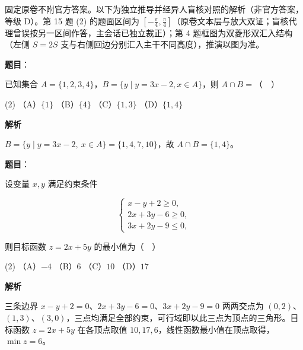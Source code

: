 

\begin{gktip}
固定原卷不附官方答案。以下为独立推导并经异人盲核对照的解析（非官方答案，等级 D）。第 15 题 (2) 的题面区间为 \(\left[-\frac{\pi}{4},\frac{\pi}{4}\right]\)（原卷文本层与放大双证；盲核代理曾误按另一区间作答，主会话已独立裁正）；第 4 题框图为双菱形双汇入结构（左侧 \(S=2S\) 支与右侧回边分别汇入主干不同高度），推演以图为准。
\end{gktip}

\begin{answer}

\textbf{题目}：

已知集合 \(A=\{1,2,3,4\}\)，\(B=\{y\mid y=3x-2,x\in A\}\)，则 \(A\cap B=\)（　）

\begin{gkopts}(2)
\task （A）\(\{1\}\)
\task （B）\(\{4\}\)
\task （C）\(\{1,3\}\)
\task （D）\(\{1,4\}\)
\end{gkopts}

\textbf{解析}

\(B=\{y\mid y=3x-2,\ x\in A\}=\{1,4,7,10\}\)，故 \(A\cap B=\{1,4\}\)。


\end{answer}
\begin{answer}

\textbf{题目}：

设变量 \(x,y\) 满足约束条件

\nopagebreak[4]
\[
\begin{cases}
x-y+2\geqslant 0,\\
2x+3y-6\geqslant 0,\\
3x+2y-9\leqslant 0,
\end{cases}
\]

则目标函数 \(z=2x+5y\) 的最小值为（　）

\begin{gkopts}(2)
\task （A）\(-4\)
\task （B）\(6\)
\task （C）\(10\)
\task （D）\(17\)
\end{gkopts}

\textbf{解析}

三条边界 \(x-y+2=0\)、\(2x+3y-6=0\)、\(3x+2y-9=0\) 两两交点为 \((0,2)\)、\((1,3)\)、\((3,0)\)，三点均满足全部约束，可行域即以此三点为顶点的三角形。目标函数 \(z=2x+5y\) 在各顶点取值 \(10,17,6\)，线性函数最小值在顶点取得，\(\min z=6\)。


\end{answer}
